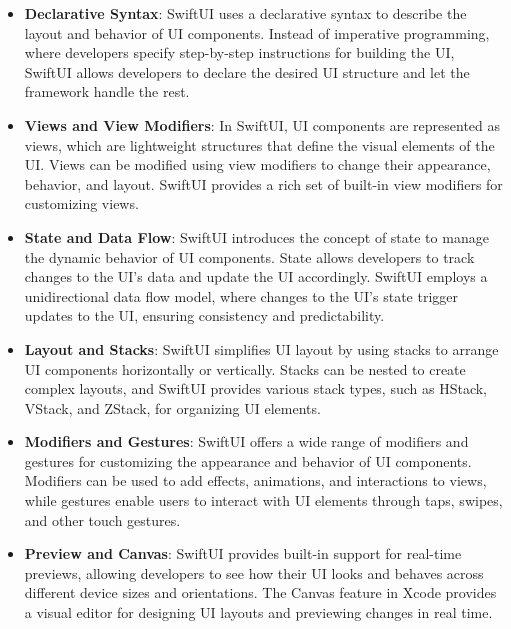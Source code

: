 \documentclass[
  biblatex,
  language=english,
  figures=false,
  sourcecodes,
  glossaries,
  index
]{kidiplom}
\begin{document}
\begin{itemize}
    \item \textbf{Declarative Syntax}: SwiftUI uses a declarative syntax to describe the layout and behavior of UI components. Instead of imperative programming, where developers specify step-by-step instructions for building the UI, SwiftUI allows developers to declare the desired UI structure and let the framework handle the rest.
    
    \item \textbf{Views and View Modifiers}: In SwiftUI, UI components are represented as views, which are lightweight structures that define the visual elements of the UI. Views can be modified using view modifiers to change their appearance, behavior, and layout. SwiftUI provides a rich set of built-in view modifiers for customizing views.
    
    \item \textbf{State and Data Flow}: SwiftUI introduces the concept of state to manage the dynamic behavior of UI components. State allows developers to track changes to the UI's data and update the UI accordingly. SwiftUI employs a unidirectional data flow model, where changes to the UI's state trigger updates to the UI, ensuring consistency and predictability.
    
    \item \textbf{Layout and Stacks}: SwiftUI simplifies UI layout by using stacks to arrange UI components horizontally or vertically. Stacks can be nested to create complex layouts, and SwiftUI provides various stack types, such as HStack, VStack, and ZStack, for organizing UI elements.
    
    \item \textbf{Modifiers and Gestures}: SwiftUI offers a wide range of modifiers and gestures for customizing the appearance and behavior of UI components. Modifiers can be used to add effects, animations, and interactions to views, while gestures enable users to interact with UI elements through taps, swipes, and other touch gestures.
    
    \item \textbf{Preview and Canvas}: SwiftUI provides built-in support for real-time previews, allowing developers to see how their UI looks and behaves across different device sizes and orientations. The Canvas feature in Xcode provides a visual editor for designing UI layouts and previewing changes in real time.
\end{itemize}
\end{document}
